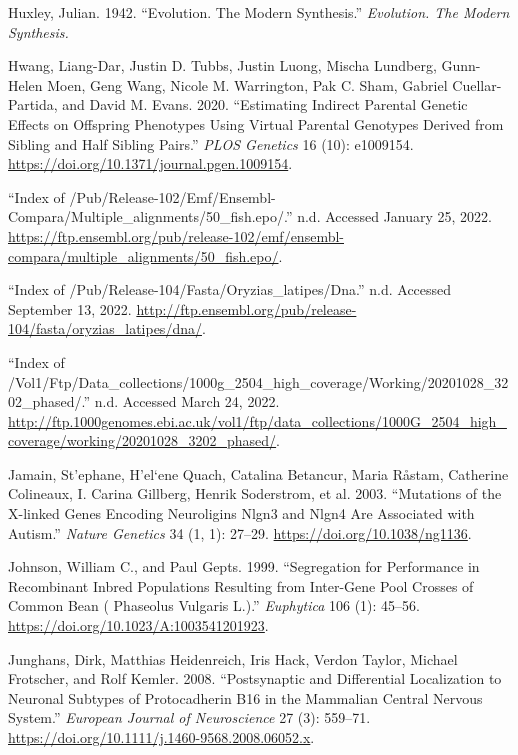 \documentclass[
]{book}
\newlength{\cslhangindent}
\newlength{\cslentryspacingunit} %
\newenvironment{CSLReferences}[2] %
 {%
  \setlength{\parindent}{0pt}
  \ifodd #1
  \let\oldpar\par
  \def\par{\hangindent=\cslhangindent\oldpar}
  \fi
  \setlength{\parskip}{#2\cslentryspacingunit}
 }%
 {}
\begin{document}
\begin{CSLReferences}{1}{0}
\leavevmode{}%
Huxley, Julian. 1942. {``Evolution. {The} Modern Synthesis.''} \emph{Evolution. The Modern Synthesis.}

\leavevmode{}%
Hwang, Liang-Dar, Justin D. Tubbs, Justin Luong, Mischa Lundberg, Gunn-Helen Moen, Geng Wang, Nicole M. Warrington, Pak C. Sham, Gabriel Cuellar-Partida, and David M. Evans. 2020. {``Estimating Indirect Parental Genetic Effects on Offspring Phenotypes Using Virtual Parental Genotypes Derived from Sibling and Half Sibling Pairs.''} \emph{PLOS Genetics} 16 (10): e1009154. \url{https://doi.org/10.1371/journal.pgen.1009154}.

\leavevmode{}%
{``Index of /Pub/Release-102/Emf/Ensembl-Compara/Multiple\_alignments/50\_fish.epo/.''} n.d. Accessed January 25, 2022. \url{https://ftp.ensembl.org/pub/release-102/emf/ensembl-compara/multiple_alignments/50_fish.epo/}.

\leavevmode{}%
{``Index of /Pub/Release-104/Fasta/Oryzias\_latipes/Dna.''} n.d. Accessed September 13, 2022. \url{http://ftp.ensembl.org/pub/release-104/fasta/oryzias_latipes/dna/}.

\leavevmode{}%
{``Index of /Vol1/Ftp/Data\_collections/{1000g}\_2504\_high\_coverage/Working/20201028\_3202\_phased/.''} n.d. Accessed March 24, 2022. \url{http://ftp.1000genomes.ebi.ac.uk/vol1/ftp/data_collections/1000G_2504_high_coverage/working/20201028_3202_phased/}.

\leavevmode{}%
Jamain, St'ephane, H'el`ene Quach, Catalina Betancur, Maria Råstam, Catherine Colineaux, I. Carina Gillberg, Henrik Soderstrom, et al. 2003. {``Mutations of the {X-linked} Genes Encoding Neuroligins {Nlgn3} and {Nlgn4} Are Associated with Autism.''} \emph{Nature Genetics} 34 (1, 1): 27--29. \url{https://doi.org/10.1038/ng1136}.

\leavevmode{}%
Johnson, William C., and Paul Gepts. 1999. {``Segregation for Performance in Recombinant Inbred Populations Resulting from Inter-Gene Pool Crosses of Common Bean ( {Phaseolus} Vulgaris {L}.).''} \emph{Euphytica} 106 (1): 45--56. \url{https://doi.org/10.1023/A:1003541201923}.

\leavevmode{}%
Junghans, Dirk, Matthias Heidenreich, Iris Hack, Verdon Taylor, Michael Frotscher, and Rolf Kemler. 2008. {``Postsynaptic and Differential Localization to Neuronal Subtypes of Protocadherin Β16 in the Mammalian Central Nervous System.''} \emph{European Journal of Neuroscience} 27 (3): 559--71. \url{https://doi.org/10.1111/j.1460-9568.2008.06052.x}.


\end{CSLReferences}
\end{document}
